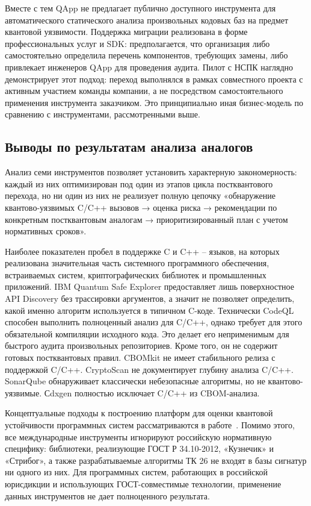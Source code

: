 \documentclass{itmo-vkr}
\begin{document}
	Вместе с тем QApp не предлагает публично доступного инструмента для автоматического статического анализа произвольных кодовых баз на предмет квантовой уязвимости. Поддержка миграции реализована в форме профессиональных услуг и SDK: предполагается, что организация либо самостоятельно определила перечень компонентов, требующих замены, либо привлекает инженеров QApp для проведения аудита. Пилот с НСПК наглядно демонстрирует этот подход: переход выполнялся в рамках совместного проекта с активным участием команды компании, а не посредством самостоятельного применения инструмента заказчиком. Это принципиально иная бизнес-модель по сравнению с инструментами, рассмотренными выше.
	
	\subsection{Выводы по результатам анализа аналогов}
	
	Анализ семи инструментов позволяет установить характерную закономерность: каждый из них оптимизирован под один из этапов цикла постквантового перехода, но ни один из них не реализует полную цепочку «обнаружение квантово-уязвимых C/C++ вызовов → оценка риска → рекомендации по конкретным постквантовым аналогам → приоритизированный план с учетом нормативных сроков».
	
	Наиболее показателен пробел в поддержке C и C++ -- языков, на которых реализована значительная часть системного программного обеспечения, встраиваемых систем, криптографических библиотек и промышленных приложений. IBM Quantum Safe Explorer предоставляет лишь поверхностное API Discovery без трассировки аргументов, а значит не позволяет определить, какой именно алгоритм используется в типичном C-коде. Технически CodeQL способен выполнить полноценный анализ для C/C++, однако требует для этого обязательной компиляции исходного кода. Это делает его неприменимым для быстрого аудита произвольных репозиториев. Кроме того, он не содержит готовых постквантовых правил. CBOMkit не имеет стабильного релиза с поддержкой C/C++. CryptoScan не документирует глубину анализа C/C++. SonarQube обнаруживает классически небезопасные алгоритмы, но не квантово-уязвимые. Сdxgen полностью исключает C/C++ из CBOM-анализа.
	
	Концептуальные подходы к построению платформ для оценки квантовой устойчивости программных систем рассматриваются в работе~\cite{larina2025platform}. Помимо этого, все международные инструменты игнорируют российскую нормативную специфику: библиотеки, реализующие ГОСТ Р 34.10-2012, «Кузнечик» и «Стрибог», а также разрабатываемые алгоритмы ТК 26 не входят в базы сигнатур ни одного из них. Для программных систем, работающих в российской юрисдикции и использующих ГОСТ-совместимые технологии, применение данных инструментов не дает полноценного результата.
	
\end{document}
